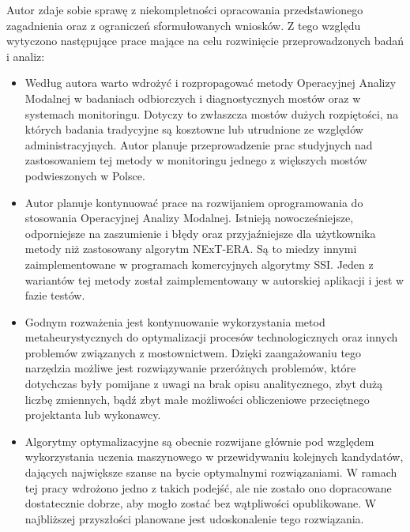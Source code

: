 Autor zdaje sobie sprawę z niekompletności opracowania przedstawionego zagadnienia oraz z ograniczeń sformułowanych wniosków. Z tego względu wytyczono następujące prace mające na celu rozwinięcie przeprowadzonych badań i analiz:
\begin{itemize}
	\item Według autora warto wdrożyć i rozpropagować metody Operacyjnej Analizy Modalnej w badaniach odbiorczych i diagnostycznych mostów oraz w systemach monitoringu. Dotyczy to zwłaszcza mostów dużych rozpiętości, na których badania tradycyjne są kosztowne lub utrudnione ze względów administracyjnych. Autor planuje przeprowadzenie prac studyjnych nad zastosowaniem tej metody w monitoringu jednego z większych mostów podwieszonych w Polsce.
	\item Autor planuje kontynuować prace na rozwijaniem oprogramowania do stosowania Operacyjnej Analizy Modalnej. Istnieją nowocześniejsze, odporniejsze na zaszumienie i błędy oraz przyjaźniejsze dla użytkownika metody niż zastosowany algorytm NExT-ERA. Są to miedzy innymi zaimplementowane w programach komercyjnych algorytmy SSI. Jeden z wariantów tej metody został zaimplementowany w autorskiej aplikacji i jest w fazie testów.
	\item Godnym rozważenia jest kontynuowanie wykorzystania metod metaheurystycznych do optymalizacji procesów technologicznych oraz innych problemów związanych z mostownictwem. Dzięki zaangażowaniu tego narzędzia możliwe jest rozwiązywanie przeróżnych problemów, które dotychczas były pomijane z uwagi na brak opisu analitycznego, zbyt dużą liczbę zmiennych, bądź zbyt małe możliwości obliczeniowe przeciętnego projektanta lub wykonawcy.
	\item  Algorytmy optymalizacyjne są obecnie rozwijane głównie pod względem wykorzystania uczenia maszynowego w przewidywaniu kolejnych kandydatów, dających największe szanse na bycie optymalnymi rozwiązaniami. W ramach tej pracy wdrożono jedno z takich podejść, ale nie zostało ono dopracowane dostatecznie dobrze, aby mogło zostać bez wątpliwości opublikowane. W najbliższej przyszłości planowane jest udoskonalenie tego rozwiązania.
\end{itemize}  




